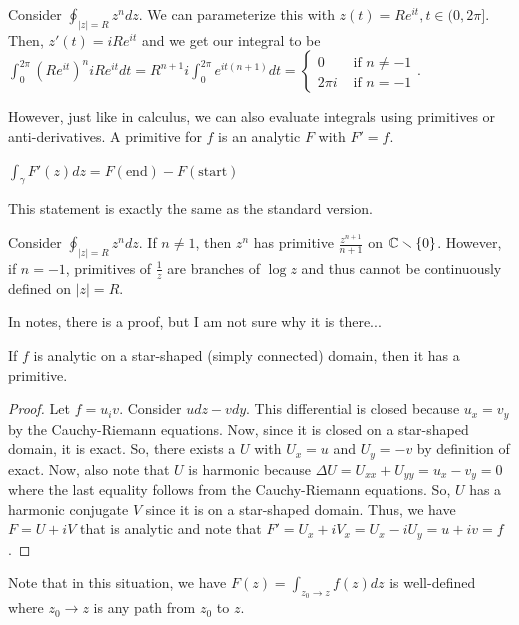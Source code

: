 \documentclass[11pt,leqno,oneside]{amsart}
\numberwithin{thm}{section}
\begin{document}
  \begin{example}
    Consider $\oint_{|z|=R} z^n dz$. We can parameterize this with
    $z(t) = Re^{it}, t \in (0,2\pi]$. Then, $z'(t) = iRe^{it}$ and we
    get our integral to be $\int_0^{2\pi} (Re^{it})^n iRe^{it} dt =
    R^{n+1} i \int_0^{2\pi} e^{it(n+1)} dt =
    \begin{cases}
      0 & \text{ if } n \neq -1 \\
      2 \pi i & \text{ if } n=-1
    \end{cases}.$
  \end{example}
  However, just like in calculus, we can also evaluate integrals using
  primitives or anti-derivatives. A primitive for $f$ is an analytic
  $F$ with $F'=f$.
  \begin{thm}
    $\int_\gamma F'(z)dz = F(\text{end}) - F(\text{start})$
  \end{thm}
  This statement is exactly the same as the standard version.
  \begin{example}
    Consider $\oint_{|z|=R} z^n dz$. If $n \neq 1$, then $z^n$ has
    primitive $\frac{z^{n+1}}{n+1}$ on ${\mathbb C} \smallsetminus
    \{0\}$. However, if $n=-1$, primitives of $\frac{1}{z}$ are
    branches of $\log z$ and thus cannot be continuously defined on
    $|z|=R$.
  \end{example}
  In notes, there is a proof, but I am not sure why it is there...
  \begin{thm}
    If $f$ is analytic on a star-shaped (simply connected) domain,
    then it has a primitive.
  \end{thm}
  \begin{proof}
    Let $f=u_iv$. Consider $udz-vdy$. This differential is closed
    because $u_x = v_y$ by the Cauchy-Riemann equations. Now, since it
    is closed on a star-shaped domain, it is exact. So, there exists a
    $U$ with $U_x = u$ and $U_y = -v$ by definition of exact. Now,
    also note that $U$ is harmonic because $\Delta U = U_{xx} + U_{yy}
    = u_x-v_y = 0$ where the last equality follows from the
    Cauchy-Riemann equations. So, $U$ has a harmonic conjugate $V$
    since it is on a star-shaped domain. Thus, we have $F = U+iV$ that
    is analytic and note that $F' = U_x + iV_x = U_x-iU_y = u+iv = f$.
  \end{proof}
  Note that in this situation, we have $F(z) = \int_{z_0 \to z}
  f(z)dz$ is well-defined where $z_0 \to z$ is any path from $z_0$ to
  $z$.
\end{document}
